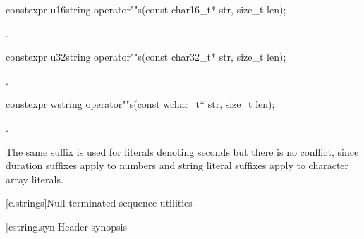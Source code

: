 %
\begin{itemdecl}
constexpr u16string operator""s(const char16_t* str, size_t len);
\end{itemdecl}
\begin{itemdescr}
\pnum
\returns
{}.
\end{itemdescr}

%
\begin{itemdecl}
constexpr u32string operator""s(const char32_t* str, size_t len);
\end{itemdecl}
\begin{itemdescr}
\pnum
\returns
{}.
\end{itemdescr}

%
\begin{itemdecl}
constexpr wstring operator""s(const wchar_t* str, size_t len);
\end{itemdecl}
\begin{itemdescr}
\pnum
\returns
{}.
\end{itemdescr}

\pnum
\begin{note}
The same suffix  is used for  literals denoting seconds but there is no conflict, since duration suffixes apply to numbers and string literal suffixes apply to character array literals.
\end{note}

[c.strings]{Null-terminated sequence utilities}

[cstring.syn]{Header  synopsis}

